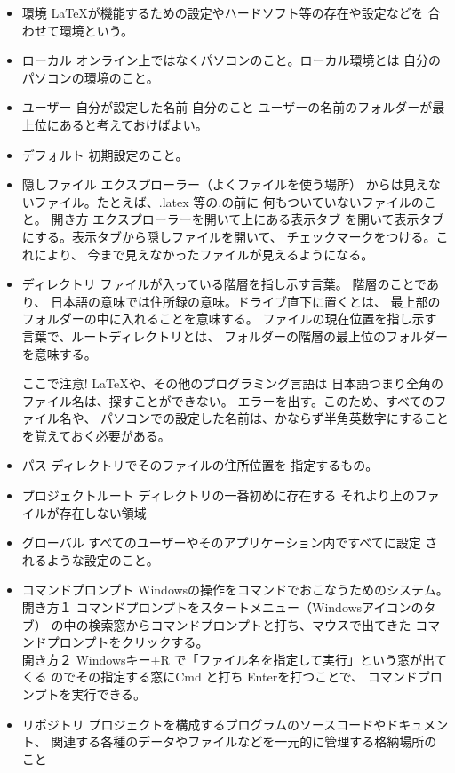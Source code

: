 \documentclass{ltjsarticle}
\begin{document}
\begin{itemize}
  \item 環境 \LaTeX が機能するための設定やハードソフト等の存在や設定などを
        合わせて環境という。
  \item ローカル  オンライン上ではなくパソコンのこと。ローカル環境とは
        自分のパソコンの環境のこと。
  \item ユーザー 自分が設定した名前 自分のこと
        ユーザーの名前のフォルダーが最上位にあると考えておけばよい。
  \item デフォルト 初期設定のこと。
  \item 隠しファイル エクスプローラー（よくファイルを使う場所）
        からは見えないファイル。たとえば、.latex 等の.の前に
        何もついていないファイルのこと。
        開き方 エクスプローラーを開いて上にある表示タブ
        を開いて表示タブにする。表示タブから隠しファイルを開いて、
        チェックマークをつける。これにより、
        今まで見えなかったファイルが見えるようになる。

  \item ディレクトリ ファイルが入っている階層を指し示す言葉。
        階層のことであり、
        日本語の意味では住所録の意味。ドライブ直下に置くとは、
        最上部のフォルダーの中に入れることを意味する。
        ファイルの現在位置を指し示す言葉で、ルートディレクトリとは、
        フォルダーの階層の最上位のフォルダーを意味する。


        ここで注意! \LaTeX や、その他のプログラミング言語は
        日本語つまり全角のファイル名は、探すことができない。
        エラーを出す。このため、すべてのファイル名や、
        パソコンでの設定した名前は、かならず半角英数字にすること
        を覚えておく必要がある。
  \item パス ディレクトリでそのファイルの住所位置を
        指定するもの。
  \item プロジェクトルート ディレクトリの一番初めに存在する
        それより上のファイルが存在しない領域
  \item グローバル すべてのユーザーやそのアプリケーション内ですべてに設定
        されるような設定のこと。
  \item コマンドプロンプト Windowsの操作をコマンドでおこなうためのシステム。\\
        開き方１ コマンドプロンプトをスタートメニュー（Windowsアイコンのタブ）
        の中の検索窓からコマンドプロンプトと打ち、マウスで出てきた
        コマンドプロンプトをクリックする。\\
        開き方２ Windowsキー+R で「ファイル名を指定して実行」という窓が出てくる
        のでその指定する窓にCmd と打ち Enterを打つことで、
        コマンドプロンプトを実行できる。
  \item リポジトリ
        プロジェクトを構成するプログラムのソースコードやドキュメント、
         関連する各種のデータやファイルなどを一元的に管理する格納場所のこと

\end{itemize}
\end{document}
